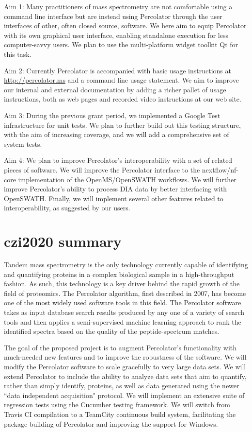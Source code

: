 \documentclass{article}
\begin{document}
Aim 1: Many practitioners of mass spectrometry are not comfortable
using a command line interface but are instead using Percolator
through the user interfaces of other, often closed source, software.
We here aim to equip Percolator with its own graphical user interface,
enabling standalone execution for less computer-savvy users. We plan
to use the multi-platform widget toolkit Qt for this task.

Aim 2: Currently Percolator is accompanied with basic usage
instructions at \url{http://percolator.ms} and a command line usage
statement. We aim to improve our internal and external documentation
by adding a richer pallet of usage instructions, both as web pages and
recorded video instructions at our web site.

Aim 3: During the previous grant period, we implemented a Google Test
infrastructure for unit tests. We plan to further build out this
testing structure, with the aim of increasing coverage, and we will add
a comprehensive set of system tests.

Aim 4: We plan to improve Percolator's interoperability with a set of
related pieces of software. We will improve the Percolator interface
to the nextflow/nf-core implementation of the OpenMS/OpenSWATH
workflows.  We will further improve Percolator's ability to process
DIA data by better interfacing with OpenSWATH.  Finally, we will
implement several other features related to interoperability, as
suggested by our users.

\section*{czi2020 summary}
Tandem mass spectrometry is the only technology currently capable of
identifying and quantifying proteins in a complex biological sample in
a high-throughput fashion. As such, this technology is a key driver
behind the rapid growth of the field of proteomics.  The Percolator
algorithm, first described in 2007, has become one of the most widely
used software tools in this field.  The Percolator software takes as
input database search results produced by any one of a variety of
search tools and then applies a semi-supervised machine learning
approach to rank the identified spectra based on the quality of the
peptide-spectrum matches.

The goal of the proposed project is to augment Percolator's
functionality with much-needed new features and to improve the
robustness of the software.
We will modify the Percolator software to scale gracefully to very
large data sets.
We will extend Percolator to include the ability to analyze data
sets that aim to quantify, rather than simply identify, proteins, as
well as data generated using the newer ``data independent acquisition"
protocol.
We will implement an extensive suite of regression tests using the
Cucumber testing framework.
We will switch from Travis CI compilation to a TeamCity continuous
build system, facilitating the package building of Percolator and improving the support for Windows.
\end{document}

